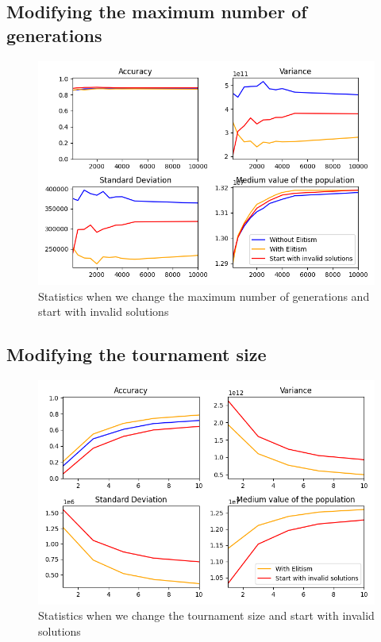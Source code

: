 \documentclass{article}
\begin{document}
   
    \subsection*{Modifying the maximum number of generations}

    \begin{figure}[H]

        \centering
        \includegraphics[width=1\textwidth]{../media/ej1/02.MaxGenerations_withInvSols_behaviour.png}
        \caption{Statistics when we change the maximum number of generations and start with invalid solutions}
        \label{Statistics when we change the maximum number of generations and start with invalid solutions}

    \end{figure}

    
    \subsection*{Modifying the tournament size}

    \begin{figure}[H]

        \centering
        \includegraphics[width=1\textwidth]{../media/ej1/03.TournamentSize_withInvSols_behaviour.png}
        \caption{Statistics when we change the tournament size and start with invalid solutions}
        \label{Statistics when we change the tournament size and start with invalid solutions}

    \end{figure}
\end{document}
